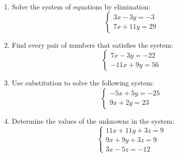 \documentclass[11pt]{article}
\begin{document}
\begin{enumerate}
\[\]
\item Solve the system of equations by elimination:
\label{eq046}\[
  \left\{ \begin{array}{l} 3x - 3y = -3 \\ 7x + 11y = 29 \end{array} \right.
\]
\item Find every pair of numbers that satisfies the system:
\label{eq047}\[
  \left\{ \begin{array}{l} 7x - 3y = -22 \\ -11x + 9y = 56 \end{array} \right.
\]
\item Use substitution to solve the following system:
\label{eq048}\[
  \left\{ \begin{array}{l} -5x + 5y = -25 \\ 9x + 2y = 23 \end{array} \right.
\]
\item Determine the values of the unknowns in the system:
\label{eq049}\[
  \left\{ \begin{array}{l} 11x + 11y + 3z = 9 \\ 9x + 9y + 3z = 9 \\ 3x - 5z = -12 \end{array} \right.
\]
\end{enumerate}
\end{document}
